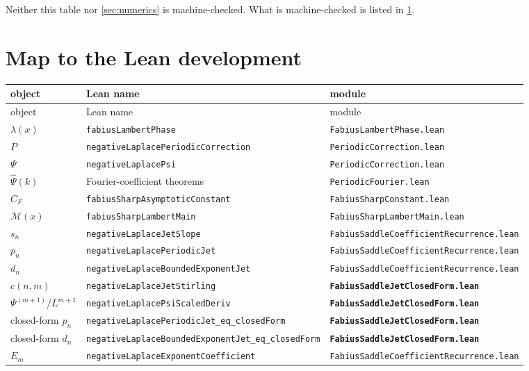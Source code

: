 \documentclass[11pt,oneside]{article}
\theoremstyle{definition}
\theoremstyle{remark}
\newcommand{\Psihat}{\widehat\Psi}
\begin{document}
Neither this table nor \cref{sec:numerics} is machine-checked.  What is
machine-checked is listed in \cref{sec:lean}.

\section{Map to the Lean development}\label{sec:lean}

\begin{center}\small
\begin{longtable}{@{}lll@{}}
\toprule
object & Lean name & module\\
\midrule
\endfirsthead
\toprule
object & Lean name & module\\
\midrule
\endhead
$\lambda(x)$ & \texttt{fabiusLambertPhase} & \texttt{FabiusLambertPhase.lean}\\
$P$ & \texttt{negativeLaplacePeriodicCorrection} & \texttt{PeriodicCorrection.lean}\\
$\Psi$ & \texttt{negativeLaplacePsi} & \texttt{PeriodicCorrection.lean}\\
$\Psihat(k)$ & Fourier-coefficient theorems & \texttt{PeriodicFourier.lean}\\
$C_F$ & \texttt{fabiusSharpAsymptoticConstant} & \texttt{FabiusSharpConstant.lean}\\
$\mathcal M(x)$ & \texttt{fabiusSharpLambertMain} & \texttt{FabiusSharpLambertMain.lean}\\
$s_n$ & \texttt{negativeLaplaceJetSlope} & \texttt{FabiusSaddleCoefficientRecurrence.lean}\\
$p_n$ & \texttt{negativeLaplacePeriodicJet} & \texttt{FabiusSaddleCoefficientRecurrence.lean}\\
$d_n$ & \texttt{negativeLaplaceBoundedExponentJet} & \texttt{FabiusSaddleCoefficientRecurrence.lean}\\
$c(n,m)$ & \texttt{negativeLaplaceJetStirling} & \textbf{\texttt{FabiusSaddleJetClosedForm.lean}}\\
$\Psi^{(m+1)}/L^{m+1}$ & \texttt{negativeLaplacePsiScaledDeriv} & \textbf{\texttt{FabiusSaddleJetClosedForm.lean}}\\
closed-form $p_n$ & \texttt{negativeLaplacePeriodicJet\_eq\_closedForm} & \textbf{\texttt{FabiusSaddleJetClosedForm.lean}}\\
closed-form $d_n$ & \texttt{negativeLaplaceBoundedExponentJet\_eq\_closedForm} & \textbf{\texttt{FabiusSaddleJetClosedForm.lean}}\\
$E_m$ & \texttt{negativeLaplaceExponentCoefficient} & \texttt{FabiusSaddleCoefficientRecurrence.lean}\\

\end{longtable}
\end{center}
\end{document}
